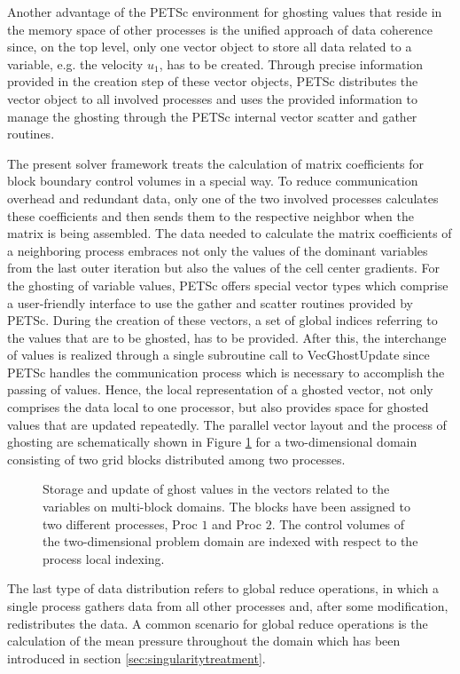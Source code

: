 Another advantage of the PETSc environment for ghosting values that reside in the memory space of other processes is the unified approach of data coherence since, on the top level, only one vector object to store all data related to a variable, e.g. the velocity \(u_1\), has to be created. Through precise information provided in the creation step of these vector objects, PETSc distributes the vector object to all involved processes and uses the provided information to manage the ghosting through the PETSc internal vector scatter and gather routines. 

The present solver framework treats the calculation of matrix coefficients for block boundary control volumes in a special way. To reduce communication overhead and redundant data, only one of the two involved processes calculates these coefficients and then sends them to the respective neighbor when the matrix is being assembled. The data needed to calculate the matrix coefficients of a neighboring process embraces not only the values of the dominant variables from the last outer iteration but also the values of the cell center gradients. For the ghosting of variable values, PETSc offers special vector types which comprise a user-friendly interface to use the gather and scatter routines provided by PETSc. During the creation of these vectors, a set of global indices referring to the values that are to be ghosted, has to be provided. After this, the interchange of values is realized through a single subroutine call to \textrm{VecGhostUpdate} since PETSc handles the communication process which is necessary to accomplish the passing of values. Hence, the local representation of a ghosted vector, not only comprises the data local to one processor, but also provides space for ghosted values that are updated repeatedly. The parallel vector layout and the process of ghosting are schematically shown in Figure \ref{fig:ghosting} for a two-dimensional domain consisting of two grid blocks distributed among two processes.

\begin{figure}[h!]
  \centering
  
  \caption{Storage and update of ghost values in the vectors related to the variables on multi-block domains. The blocks have been assigned to two different processes, \textrm{Proc} $1$ and \textrm{Proc} $2$. The control volumes of the two-dimensional problem domain are indexed with respect to the process local indexing.}
  \label{fig:ghosting}
\end{figure}

The last type of data distribution refers to global reduce operations, in which a single process gathers data from all other processes and, after some modification, redistributes the data. A common scenario for global reduce operations is the calculation of the mean pressure throughout the domain which has been introduced in section \ref{sec:singularitytreatment}.


